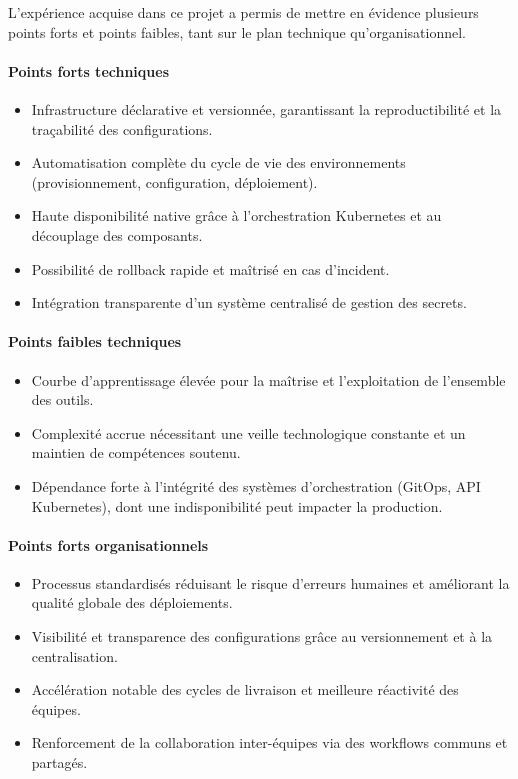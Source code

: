 L’expérience acquise dans ce projet a permis de mettre en évidence plusieurs points forts et points faibles, tant sur le plan technique qu’organisationnel.

\paragraph{Points forts techniques}
\begin{itemize}
	\item Infrastructure déclarative et versionnée, garantissant la reproductibilité et la traçabilité des configurations.
	\item Automatisation complète du cycle de vie des environnements (provisionnement, configuration, déploiement).
	\item Haute disponibilité native grâce à l’orchestration Kubernetes et au découplage des composants.
	\item Possibilité de rollback rapide et maîtrisé en cas d’incident.
	\item Intégration transparente d’un système centralisé de gestion des secrets.
\end{itemize}

\paragraph{Points faibles techniques}
\begin{itemize}
	\item Courbe d’apprentissage élevée pour la maîtrise et l’exploitation de l’ensemble des outils.
	\item Complexité accrue nécessitant une veille technologique constante et un maintien de compétences soutenu.
	\item Dépendance forte à l’intégrité des systèmes d’orchestration (GitOps, API Kubernetes), dont une indisponibilité peut impacter la production.
\end{itemize}

\paragraph{Points forts organisationnels}
\begin{itemize}
	\item Processus standardisés réduisant le risque d’erreurs humaines et améliorant la qualité globale des déploiements.
	\item Visibilité et transparence des configurations grâce au versionnement et à la centralisation.
	\item Accélération notable des cycles de livraison et meilleure réactivité des équipes.
	\item Renforcement de la collaboration inter-équipes via des workflows communs et partagés.
\end{itemize}

